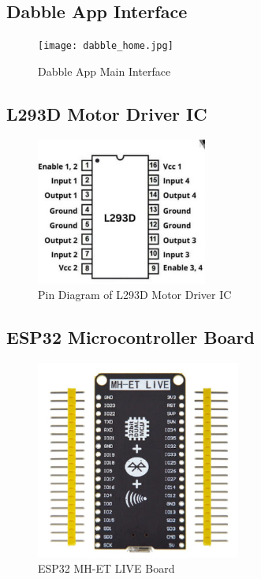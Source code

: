 \documentclass[a4paper,12pt]{article}
\begin{document}
\subsection*{Dabble App Interface}
\begin{figure}[!h]
\centering
\texttt{[image: dabble\_home.jpg]}
\caption{Dabble App Main Interface}
\end{figure}

\subsection*{L293D Motor Driver IC}
\begin{figure}[!h]
\centering
\includegraphics[width=0.5\textwidth]{L293D_IC.png}
\caption{Pin Diagram of L293D Motor Driver IC}
\end{figure}

\subsection*{ESP32 Microcontroller Board}
\begin{figure}[!h]
\centering
\includegraphics[width=0.6\textwidth]{ESP32.png}
\caption{ESP32 MH-ET LIVE Board}
\end{figure}
\end{document}
